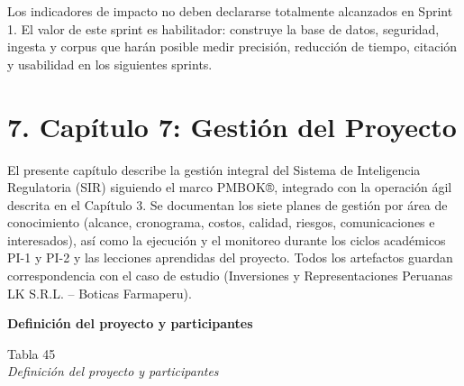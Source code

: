 \documentclass[12pt,a4paper,oneside]{report}
\begin{document}
Los indicadores de impacto no deben declararse totalmente alcanzados en
Sprint 1. El valor de este sprint es habilitador: construye la base de
datos, seguridad, ingesta y corpus que harán posible medir precisión,
reducción de tiempo, citación y usabilidad en los siguientes sprints.

\section{7. Capítulo 7: Gestión del
Proyecto}\label{capuxedtulo-7-gestiuxf3n-del-proyecto}

El presente capítulo describe la gestión integral del Sistema de
Inteligencia Regulatoria (SIR) siguiendo el marco PMBOK®, integrado con
la operación ágil descrita en el Capítulo 3. Se documentan los siete
planes de gestión por área de conocimiento (alcance, cronograma, costos,
calidad, riesgos, comunicaciones e interesados), así como la ejecución y
el monitoreo durante los ciclos académicos PI-1 y PI-2 y las lecciones
aprendidas del proyecto. Todos los artefactos guardan correspondencia
con el caso de estudio (Inversiones y Representaciones Peruanas LK
S.R.L. -- Boticas Farmaperu).

\textbf{Definición del proyecto y participantes}

\label{_Toc231672300}{}Tabla 45\\
\emph{Definición del proyecto y participantes}
\end{document}

